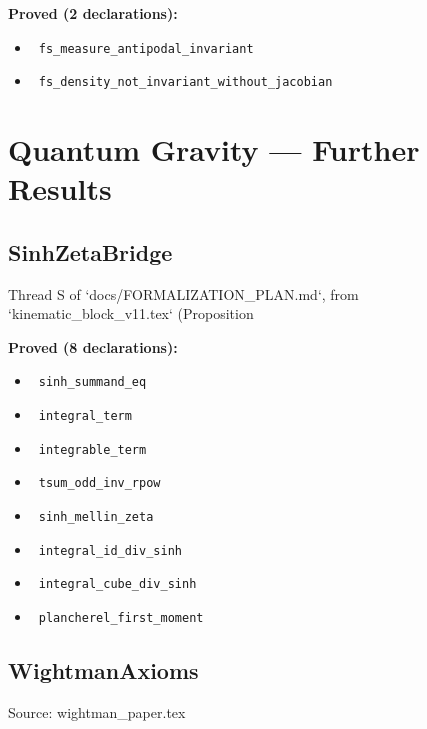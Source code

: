 \documentclass{report}
\theoremstyle{definition}
\begin{document}
\begin{itemize}
\begin{itemize}
\noindent\textbf{Proved (2 declarations):}
\begin{itemize}
  \item {}\leanok\ \texttt{fs\_measure\_antipodal\_invariant}
  \item {}\leanok\ \texttt{fs\_density\_not\_invariant\_without\_jacobian}
\end{itemize}

\section{Quantum Gravity --- Further Results}

\subsection{SinhZetaBridge}
Thread S of `docs/FORMALIZATION\_PLAN.md`, from `kinematic\_block\_v11.tex` (Proposition

\noindent\textbf{Proved (8 declarations):}
\begin{itemize}
  \item {}\leanok\ \texttt{sinh\_summand\_eq}
  \item {}\leanok\ \texttt{integral\_term}
  \item {}\leanok\ \texttt{integrable\_term}
  \item {}\leanok\ \texttt{tsum\_odd\_inv\_rpow}
  \item {}\leanok\ \texttt{sinh\_mellin\_zeta}
  \item {}\leanok\ \texttt{integral\_id\_div\_sinh}
  \item {}\leanok\ \texttt{integral\_cube\_div\_sinh}
  \item {}\leanok\ \texttt{plancherel\_first\_moment}
\end{itemize}

\subsection{WightmanAxioms}
Source: wightman\_paper.tex


\end{itemize}
\end{itemize}
\end{document}
